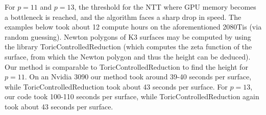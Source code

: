 \documentclass[a4paper]{article}
\theoremstyle{definition}
\theoremstyle{remark}
\begin{document}
For $p = 11$ and $p = 13$, the threshold for the NTT where 
GPU memory becomes a bottleneck is reached, and the algorithm 
faces a sharp drop in speed. The examples below took about 12 compute hours
on the aforementioned 2080Tis (via random guessing).
Newton polygons of K3 surfaces may be computed by using the
library ToricControlledReduction
\cite{chk-2019-toric-controlled-reduction} 
(which computes the zeta
function of the surface, from which the Newton polygon and thus the
height can be deduced).
Our method is comparable to ToricControlledReduction to find
the height for \(p = 11\). On an Nvidia 3090 our method took 
around 39-40 seconds per surface, while ToricControlledReduction took 
about 43 seconds per surface.
For \(p = 13\), our 
code took 100-110 seconds per surface, while ToricControlledReduction
again took about 43 seconds per surface.



\end{document}
